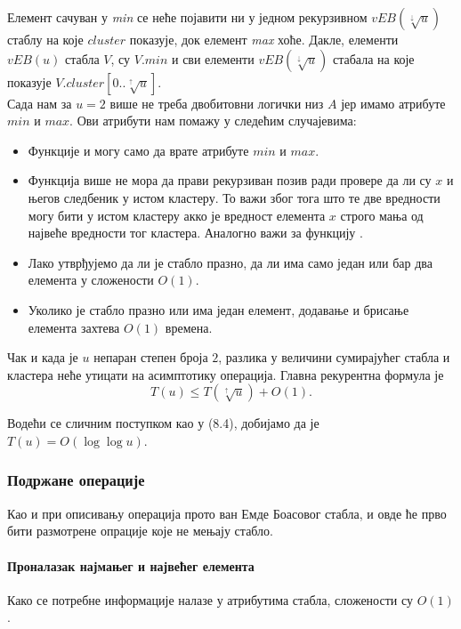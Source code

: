 \documentclass[11pt, a4paper]{article}
\theoremstyle{remark}
\numberwithin{equation}{section}
\begin{document}
	\indent Елемент сачуван у \textit{min} се неће појавити ни у једном рекурзивном $vEB(\sqrt[\downarrow]{u})$ стаблу на које $cluster$ показује, док елемент \textit{max} хоће. Дакле, елементи $vEB(u)$ стабла $V$, су $V.min$ и сви елементи $vEB(\sqrt[\downarrow]{u})$ стабала на које показује $V.cluster[0..\sqrt[\uparrow]{u}]$.\\
	\indent Сада нам за $u=2$ више не треба двобитовни логички низ $A$ јер имамо атрибуте $min$ и $max$. Ови атрибути нам помажу у следећим случајевима:
	\begin{itemize}
		\item Функције  и  могу само да врате атрибуте $min$ и $max$.
		\item Функција  више не мора да прави рекурзиван позив ради провере да ли су $x$ и његов следбеник у истом кластеру. То важи због тога што те две вредности могу бити у истом кластеру акко је вредност елемента $x$ строго мања од највеће вредности тог кластера. Аналогно важи за функцију .
		\item Лако утврђујемо да ли је стабло празно, да ли има само један или бар два елемента у сложености $O(1)$.
		\item Уколико је стабло празно или има један елемент, додавање и брисање елемента захтева $O(1)$ времена.
	\end{itemize}

	Чак и када је $u$ непаран степен броја $2$, разлика у величини сумирајућег стабла и кластера неће утицати на асимптотику операција. Главна рекурентна формула је
	\begin{equation}
	T(u)\leq T(\sqrt[\uparrow]{u})+O(1).
	\end{equation}
	
	Водећи се сличним поступком као у (8.4), добијамо да је $T(u)=O(\log\log u)$.
	
	\subsubsection{Подржане операције}
	Као и при описивању операција прото ван Емде Боасовог стабла, и овде ће прво бити размотрене опрације које не мењају стабло.
	
	\paragraph{Проналазак најмањег и највећег елемента}
	Како се потребне информације налазе у атрибутима стабла, сложености су $O(1)$.
	
\end{document}
